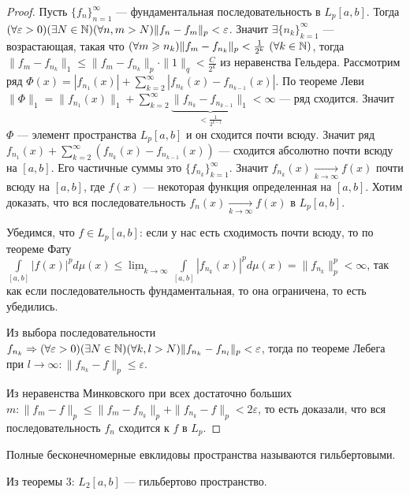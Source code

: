 \begin{proof}
	Пусть $\{f_n\}_{n=1}^\infty$ --- фундаментальная последовательность в $L_p[a,b]$. Тогда $(\forall\varepsilon >0)(\exists N\in \mathbb{N})(\forall n,m>N) \|f_n-f_m\|_p<\varepsilon$. Значит $\exists\{n_k\}_{k=1}^\infty$ --- возрастающая, такая что $(\forall m\geqslant n_k) \|f_m-f_{n_k}\|_p<\frac{1}{2^k}\ (\forall k\in \mathbb{N})$, тогда  $\|f_m-f_{n_k}\|_1\leqslant\|f_m-f_{n_k}\|_p\cdot\|1\|_q<\frac{C}{2^k}$ из неравенства Гельдера. Рассмотрим ряд $\Phi(x)=|f_{n_1}(x)|+\sum\limits_{k=2}^\infty |f_{n_k}(x)-f_{n_{k-1}}(x)|$. По теореме Леви $\|\Phi\|_1= \|f_{n_1}(x)\|_1+\sum\limits_{k=2}^\infty \underbrace{\|f_{n_k}-f_{n_{k-1}}\|_1}_{<\frac{1}{2^{k-1}}}<\infty$ --- ряд сходится. Значит $\Phi$ --- элемент пространства $L_p[a,b]$ и он сходится почти всюду. Значит ряд $f_{n_1}(x)+\sum\limits_{k=2}^\infty (f_{n_k}(x)-f_{n_{k-1}}(x))$ --- сходится абсолютно почти всюду на $[a,b]$. Его частичные суммы это $\{f_{n_k}\}_{k=1}^\infty$. Значит $f_{n_k}(x)\underset{k\to\infty}{\to}f(x)$ почти всюду на $[a,b]$, где $f(x)$ --- некоторая функция определенная на $[a,b]$. Хотим доказать, что вся последовательность $f_n(x)\underset{k\to\infty}{\to}f(x)$ в $L_p[a,b]$.
	
	Убедимся, что $f\in L_p[a,b]$: если у нас есть сходимость почти всюду, то по теореме Фату $\int\limits_{[a,b]}|f(x)|^pd\mu(x)\leqslant\underline{\lim}_{k\to\infty}\int\limits_{[a,b]}|f_{n_k}(x)|^pd\mu(x)=\|f_{n_k}\|^p_p<\infty$, так как если последовательность фундаментальная, то она ограничена, то есть убедились.
	
	Из выбора последовательности $f_{n_k}\Rightarrow(\forall\varepsilon>0)(\exists N\in\mathbb{N})(\forall k,l>N) \|f_{n_k}-f_{n_l}\|_p<\varepsilon$, тогда по теореме Лебега при $l\to\infty: \|f_{n_k}-f\|_p\leqslant\varepsilon$.
	
	Из неравенства Минковского при всех достаточно больших $m:\|f_m-f\|_p\leqslant \|f_m-f_{n_k}\|_p+\|f_{n_k}-f\|_p<2\varepsilon$, то есть доказали, что вся последовательность $f_n$ сходится к $f$ в $L_p$.
\end{proof}

\begin{Def}
	Полные бесконечномерные евклидовы пространства называются гильбертовыми.
\end{Def}

\begin{corollary}
	Из теоремы 3: $L_2[a,b]$ --- гильбертово пространство.
\end{corollary}


